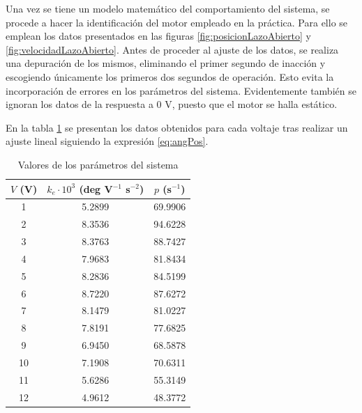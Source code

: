 \documentclass{article}
\begin{document}
Una vez se tiene un modelo matemático del comportamiento del sistema, se procede a hacer la identificación del motor empleado en la práctica. Para ello se emplean los datos presentados en las figuras \ref{fig:posicionLazoAbierto} y \ref{fig:velocidadLazoAbierto}. Antes de proceder al ajuste de los datos, se realiza una depuración de los mismos, eliminando el primer segundo de inacción y escogiendo únicamente los primeros dos segundos de operación. Esto evita la incorporación de errores en los parámetros del sistema. Evidentemente también se ignoran los datos de la respuesta a 0 V, puesto que el motor se halla estático.

En la tabla \ref{tab:paramPerVoltage} se presentan los datos obtenidos para cada voltaje tras realizar un ajuste lineal siguiendo la expresión \ref{eq:angPos}.

\begin{table}[H]
\centering
\caption{Valores de los parámetros del sistema}
\label{tab:paramPerVoltage}
\begin{tabular}{ccc}
$V$ (V) & $k_e\cdot10^3$ (deg V$^{-1}$ s$^{-2}$) & $p$ (s$^{-1}$) \\ \hline
1       & 5.2899                                 & 69.9906        \\
2       & 8.3536                                 & 94.6228        \\
3       & 8.3763                                 & 88.7427        \\
4       & 7.9683                                 & 81.8434        \\
5       & 8.2836                                 & 84.5199        \\
6       & 8.7220                                 & 87.6272        \\
7       & 8.1479                                 & 81.0227        \\
8       & 7.8191                                 & 77.6825        \\
9       & 6.9450                                 & 68.5878        \\
10      & 7.1908                                 & 70.6311        \\
11      & 5.6286                                 & 55.3149        \\
12      & 4.9612                                 & 48.3772        
\end{tabular}
\end{table}
\end{document}
